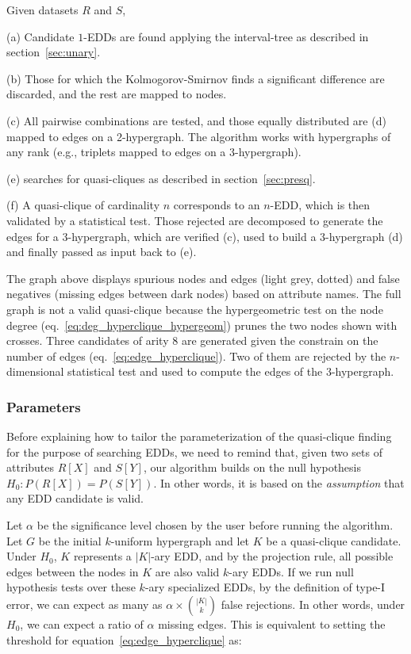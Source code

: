 \begin{multicols}{2}
 Given datasets $R$ and $S$,

(a) Candidate $1$-EDDs are found applying the interval-tree as described in section~\ref{sec:unary}.

(b) Those for which the Kolmogorov-Smirnov finds a significant difference are discarded,
    and the rest are mapped to nodes.

(c) All pairwise combinations are tested, and those equally distributed are
    (d) mapped to edges on a 2-hypergraph. The algorithm works with hypergraphs of any rank
    (e.g., triplets mapped to edges on a 3-hypergraph).
    
(e) \PresQ searches for quasi-cliques as described in section~\ref{sec:presq}.

(f) A quasi-clique of cardinality $n$ corresponds to an $n$-EDD, which is then validated by
a statistical test. Those rejected are decomposed to generate the edges for a 3-hypergraph, which are
verified (c), used to build a $3$-hypergraph (d) and finally passed as input back to (e).

The graph above displays spurious nodes and edges (light grey, dotted) and false negatives
(missing edges between dark nodes) based on attribute names. The full graph is not a valid
quasi-clique because the hypergeometric
test on the node degree (eq.~\ref{eq:deg_hyperclique_hypergeom}) prunes the two nodes shown with
crosses.
Three candidates of arity 8 are generated given the constrain on the number of edges 
(eq.~\ref{eq:edge_hyperclique}). Two of them are rejected by the $n$-dimensional statistical test and used to compute the edges of the $3$-hypergraph.

\end{multicols}
    
\newpage

\subsubsection{Parameters}

Before explaining how to tailor the parameterization of the quasi-clique finding for the purpose
of searching EDDs, we need to remind that, given two sets of attributes $R[X]$ and $S[Y]$,
our algorithm builds on the null hypothesis $H_0: P(R[X]) = P(S[Y])$.
In other words, it is based on the \emph{assumption} that any EDD candidate is valid.

Let $\alpha$ be the significance level chosen by the user before running the algorithm.
Let $G$ be the initial $k$-uniform hypergraph and let $K$ be a quasi-clique candidate.
Under $H_0$, $K$ represents a $|K|$-ary EDD, and by the projection rule,
all possible edges between the nodes in $K$ are also valid $k$-ary EDDs.
If we run null hypothesis tests over these $k$-ary specialized EDDs,
by the definition of type-I error, we can expect as many as $\alpha \times \binom{|K|}{k}$ false rejections.
In other words, under $H_0$, we can expect a ratio of $\alpha$ missing edges.
This is equivalent to setting the threshold for equation~\ref{eq:edge_hyperclique} as:

